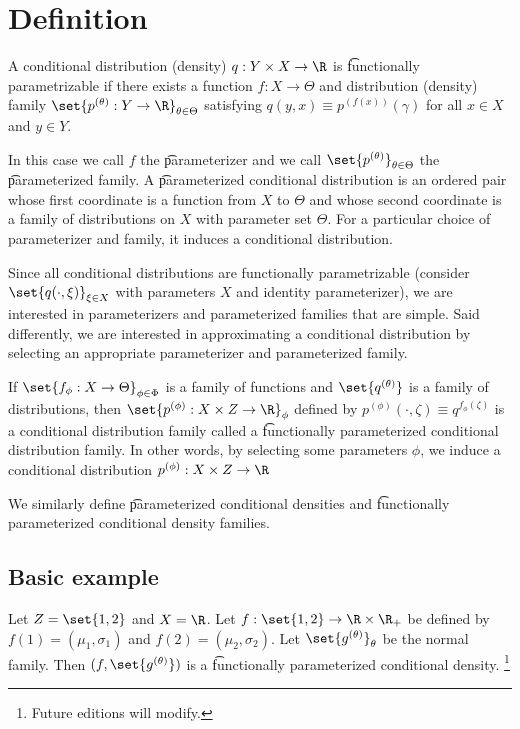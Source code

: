 
\section*{Definition}

A conditional distribution (density) $q: Y \times X \to \R $ is \t{functionally parametrizable} if there exists a function $f: X \to \Theta$ and distribution (density) family $\set{p^{(\theta )}: Y \to \R }_{\theta  \in \Theta}$ satisfying $q(y, x) \equiv p^{(f(x))}(\gamma )$ for all $x \in X$ and $y \in Y$.

In this case we call $f$ the \t{parameterizer} and we call $\set{p^{(\theta )}}_{\theta  \in \Theta}$ the \t{parameterized family}.
A \t{parameterized conditional distribution} is an ordered pair whose first coordinate is a function from $X$ to $\Theta$ and whose second coordinate is a family of distributions on $X$ with parameter set $\Theta$.
For a particular choice of parameterizer and family, it induces a conditional distribution.

Since all conditional distributions are functionally parametrizable (consider $\set{q(\cdot , \xi )}_{\xi  \in X}$ with parameters $X$ and identity parameterizer), we are interested in parameterizers and parameterized families that are simple.
Said differently, we are interested in approximating a conditional distribution by selecting an appropriate parameterizer and parameterized family.

If $\set{f_{\phi }: X \to \Theta}_{\phi  \in \Phi}$ is a family of functions and $\set{q^{(\theta )}}$ is a family of distributions, then $\set{p^{(\phi )}: X \times Z \to \R }_{\phi }$ defined by $p^{(\phi )}(\cdot , \zeta ) \equiv q^{f_\phi (\zeta )}$ is a conditional distribution family called a \t{functionally parameterized conditional distribution family}.
In other words, by selecting some parameters $\phi $, we induce a conditional distribution $p^{(\phi )}: X \times Z \to \R $

We similarly define \t{parameterized conditional densities} and \t{functionally parameterized conditional density families}.

\subsection*{Basic example}

Let $Z = \set{1, 2}$ and $X = \R $. Let $f: \set{1, 2} \to \R  \times \R _+$ be defined by $f(1) = (\mu _1, \sigma _1)$ and $f(2) = (\mu _2, \sigma _2)$.
Let $\set{g^{(\theta )}}_{\theta }$ be the normal family.
Then $(f, \set{g^{(\theta )}})$ is a \t{functionally parameterized conditional density}.
    \ifhmode\unskip\fi\footnote{
Future editions will modify.
    }

\blankpage